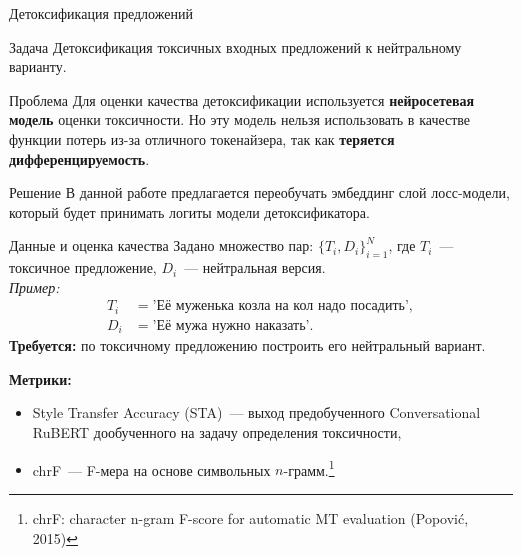 \documentclass[12pt, fleqn, xcolor=x11names, xcolor=table, aspectratio=169]{beamer}
\begin{document}
\begin{frame}{Детоксификация предложений}


\begin{alertblock}{Задача}
Детоксификация токсичных входных предложений к нейтральному варианту.
\end{alertblock}

\begin{alertblock}{Проблема}
Для оценки качества детоксификации используется \textbf{нейросетевая модель} оценки токсичности.
Но эту модель нельзя использовать в качестве функции потерь из-за отличного токенайзера, так как \textbf{теряется дифференцируемость}. 
\end{alertblock}

\begin{alertblock}{Решение}
В данной работе предлагается переобучать эмбеддинг слой лосс-модели, который будет принимать логиты модели детоксификатора. 
\end{alertblock}

\end{frame}
\begin{frame}{Данные и оценка качества}
Задано множество пар:  $\{T_i, D_{i}\}_{i=1}^{N}$, где $T_i$~--- токсичное предложение, $D_{i}$~--- нейтральная версия.  \\

\textit{Пример:} 
\begin{align*}
T_i &= \textit{'Её муженька козла на кол надо посадить'}, \\
D_{i} &=  \textit{'Её мужа нужно наказать'}.
\end{align*}
\textbf{Требуется:} по токсичному предложению построить его нейтральный вариант. 

\textbf{Метрики:}
    \begin{itemize}
        \item Style Transfer Accuracy (STA)~--- выход предобученного Conversational RuBERT дообученного на задачу определения токсичности,
        \item chrF~--- F-мера на основе символьных $n$-грамм.\footnote{chrF: character n-gram F-score for automatic MT evaluation (Popović, 2015)}
    \end{itemize}

\end{frame}
\end{document}
